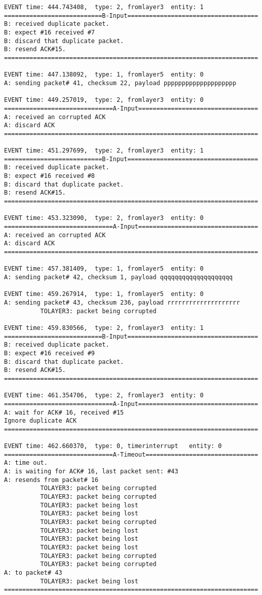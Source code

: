 \documentclass[12pt]{article}
\begin{document}
\begin{verbatim}
EVENT time: 444.743408,  type: 2, fromlayer3  entity: 1
===========================B-Input====================================
B: received duplicate packet.
B: expect #16 received #7
B: discard that duplicate packet.
B: resend ACK#15.
======================================================================

EVENT time: 447.138092,  type: 1, fromlayer5  entity: 0
A: sending packet# 41, checksum 22, payload pppppppppppppppppppp

EVENT time: 449.257019,  type: 2, fromlayer3  entity: 0
==============================A-Input=================================
A: received an corrupted ACK 
A: discard ACK
======================================================================

EVENT time: 451.297699,  type: 2, fromlayer3  entity: 1
===========================B-Input====================================
B: received duplicate packet.
B: expect #16 received #8
B: discard that duplicate packet.
B: resend ACK#15.
======================================================================

EVENT time: 453.323090,  type: 2, fromlayer3  entity: 0
==============================A-Input=================================
A: received an corrupted ACK 
A: discard ACK
======================================================================

EVENT time: 457.381409,  type: 1, fromlayer5  entity: 0
A: sending packet# 42, checksum 1, payload qqqqqqqqqqqqqqqqqqqq

EVENT time: 459.267914,  type: 1, fromlayer5  entity: 0
A: sending packet# 43, checksum 236, payload rrrrrrrrrrrrrrrrrrrr
          TOLAYER3: packet being corrupted

EVENT time: 459.830566,  type: 2, fromlayer3  entity: 1
===========================B-Input====================================
B: received duplicate packet.
B: expect #16 received #9
B: discard that duplicate packet.
B: resend ACK#15.
======================================================================

EVENT time: 461.354706,  type: 2, fromlayer3  entity: 0
==============================A-Input=================================
A: wait for ACK# 16, received #15
Ignore duplicate ACK
======================================================================

EVENT time: 462.660370,  type: 0, timerinterrupt   entity: 0
==============================A-Timeout===============================
A: time out. 
A: is waiting for ACK# 16, last packet sent: #43
A: resends from packet# 16 
          TOLAYER3: packet being corrupted
          TOLAYER3: packet being corrupted
          TOLAYER3: packet being lost
          TOLAYER3: packet being lost
          TOLAYER3: packet being corrupted
          TOLAYER3: packet being lost
          TOLAYER3: packet being lost
          TOLAYER3: packet being lost
          TOLAYER3: packet being corrupted
          TOLAYER3: packet being corrupted
A: to packet# 43
          TOLAYER3: packet being lost
======================================================================


\end{verbatim}
\end{document}
